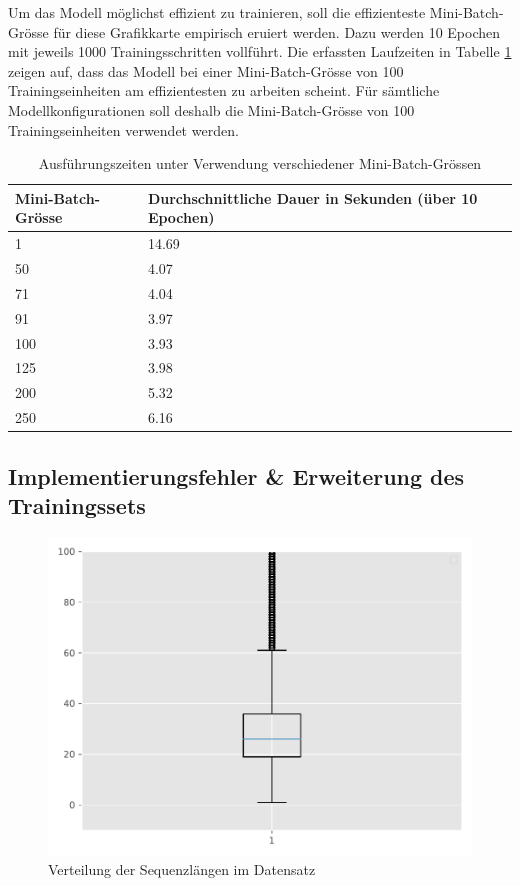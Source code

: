Um das Modell möglichst effizient zu trainieren, soll die effizienteste Mini-Batch-Grösse für diese Grafikkarte empirisch eruiert werden.
Dazu werden 10 Epochen mit jeweils 1000 Trainingsschritten vollführt.
Die erfassten Laufzeiten in Tabelle \ref{tab:best-batch-size} zeigen auf, dass das Modell bei einer Mini-Batch-Grösse von 100 Trainingseinheiten
am effizientesten zu arbeiten scheint.
Für sämtliche Modellkonfigurationen soll deshalb die Mini-Batch-Grösse von 100 Trainingseinheiten verwendet werden.

\begin{center}
    \begin{table}
        \centering
        \begin{tabular}{ |l|l| }

            \hline
            \textbf{Mini-Batch-Grösse} & \textbf{Durchschnittliche Dauer in Sekunden (über 10 Epochen)} \\
            \hline
            1 & 14.69 \\
            50 & 4.07 \\
            71 & 4.04 \\
            91 & 3.97 \\
            100 & 3.93 \\
            125 & 3.98 \\
            200 & 5.32 \\
            250 & 6.16 \\
            \hline
        \end{tabular}
        \caption{Ausführungszeiten unter Verwendung verschiedener Mini-Batch-Grössen}
        \label{tab:best-batch-size}
    \end{table}
\end{center}


\subsection{Implementierungsfehler \& Erweiterung des Trainingssets}
\label{subsec:enhancing-training-set}

\begin{figure}
    \centering
    \includegraphics[width=0.75\linewidth]{images/analysis/histogram-lengths.pdf}
    \caption{Verteilung der Sequenzlängen im Datensatz }
    \label{fig:sequence-lengths}
\end{figure}

